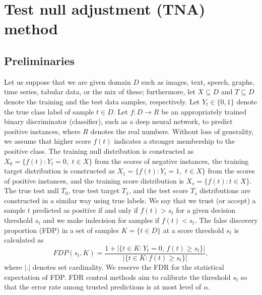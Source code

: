 \documentclass{article}
\begin{document}
\section{Test null adjustment (TNA) method}
\subsection{Preliminaries}

Let us suppose that we are given domain $D$ such as images, text, speech, graphs, time series, tabular data, or the mix of these; furthermore, let $X\subseteq D$ and $T\subseteq D$ denote the training and  the test data samples, respectively. Let $Y_t\in\{0,1\}$ denote the true class label of sample $t\in D$. Let $f:D\rightarrow R$ be an appropriately trained binary discriminator (classifier), such as a deep neural network, to predict positive instances, where $R$ denotes the real numbers. Without loss of generality, we assume that higher score $f(t)$ indicates a stronger membership to the positive class. The training null distribution is constructed as $X_0=\{f(t):Y_t = 0,\,\,  t\in X\}$ from the scores of negative instances, the training target distribution is constructed as $X_1=\{f(t): Y_t = 1,\,\,  t\in X\}$ from the scores of positive instances, and the training score distribution is $X_s=\{f(t): t\in X\}$. The true test null $T_0$, true test target $T_1$, and the test score $T_s$ distributions are constructed in a similar way using true labels. We say that we trust (or accept) a  sample $t$ predicted as positive if and only if $f(t)>s_t$ for a given decision threshold  $s_t$ and we make indecision for samples if $f(t) < s_t$. The false discovery proportion (FDP) in a set of samples $K=\{t\in D\}$ at a score threshold $s_t$ is calculated as 
\begin{equation*}
	FDP(s_t,K)=\frac{1+|\{t\in K: Y_t=0,\,f(t)\ge s_t\}|}{|\{t\in K:f(t)\ge s_t\}|},
\end{equation*}
\noindent where $|.|$ denotes set cardinality. We reserve the FDR for the statistical expectation of FDP. FDR control methods aim to calibrate the threshold  $s_t$ so that the error rate among trusted predictions is at most level of $\alpha$. 
\end{document}
